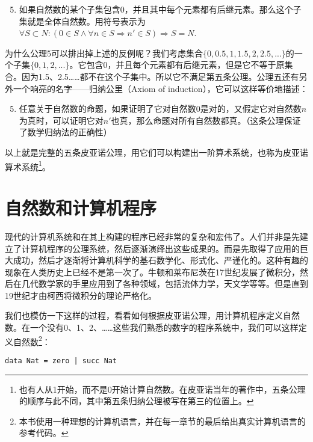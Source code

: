 \documentclass[UTF8]{article}
\begin{document}
\begin{enumerate}
  \setcounter{enumi}{4}
  \item 如果自然数的某个子集包含0，并且其中每个元素都有后继元素。那么这个子集就是全体自然数。用符号表示为$\forall S \subset N: (0 \in S \land \forall n \in S \Rightarrow n' \in S) \Rightarrow S = N$.
\end{enumerate}

为什么公理5可以排出掉上述的反例呢？我们考虑集合$\{0, 0.5, 1, 1.5, 2, 2.5, ...\}$的一个子集$\{0, 1, 2, ...\}$。它包含0，并且每个元素都有后继元素，但是它不等于原集合。因为1.5、2.5……都不在这个子集中。所以它不满足第五条公理。公理五还有另外一个响亮的名字——归纳公里（Axiom of induction），它可以这样等价地描述：

\begin{enumerate}
  \setcounter{enumi}{4}
  \item 任意关于自然数的命题，如果证明了它对自然数0是对的，又假定它对自然数$n$为真时，可以证明它对$n'$也真，那么命题对所有自然数都真。（这条公理保证了数学归纳法的正确性）
\end{enumerate}

以上就是完整的五条皮亚诺公理，用它们可以构建出一阶算术系统，也称为皮亚诺算术系统\footnote{也有人从1开始，而不是0开始计算自然数。在皮亚诺当年的著作中，五条公理的顺序与此不同，其中第五条归纳公理被写在第三的位置上。}。

\section{自然数和计算机程序}
现代的计算机系统和在其上构建的程序已经非常的复杂和宏伟了。人们并非是先建立了计算机程序的公理系统，然后逐渐演绎出这些成果的。而是先取得了应用的巨大成功，然后才逐渐将计算机科学的基石数学化、形式化、严谨化的。这种有趣的现象在人类历史上已经不是第一次了。牛顿和莱布尼茨在17世纪发展了微积分，然后在几代数学家的手里应用到了各种领域，包括流体力学，天文学等等。但是直到19世纪才由柯西将微积分的理论严格化。

我们也模仿一下这样的过程，看看如何根据皮亚诺公理，用计算机程序定义自然数。在一个没有0、1、2、……这些我们熟悉的数字的程序系统中，我们可以这样定义自然数\footnote{本书使用一种理想的计算机语言，并在每一章节的最后给出真实计算机语言的参考代码。}：

\lstset{language=Haskell}
\begin{lstlisting}
data Nat = zero | succ Nat
\end{lstlisting}

\end{document}
